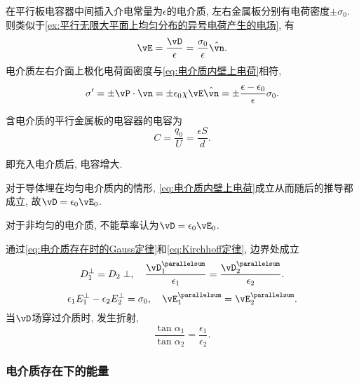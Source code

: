 \documentclass[../Electromagnetism.tex]{subfiles}
\begin{document}
\begin{ex}
	在平行板电容器中间插入介电常量为$\epsilon$的电介质, 左右金属板分别有电荷密度$\pm\sigma_{0}$. 则类似于\cref{ex:平行无限大平面上均匀分布的异号电荷产生的电场}, 有
	\[ \vE = \frac{\vD}{\epsilon} = \frac{\sigma_0}{\epsilon}\hat{\vn}. \]
	电介质左右介面上极化电荷面密度与\eqref{eq:电介质内壁上电荷}相符,
	\[ \sigma' = \pm\vP\cdot\vn = \pm \epsilon_0\chi\vE\hat{\vn} = \pm\frac{\epsilon - \epsilon_0}{\epsilon}\sigma_0. \]
\end{ex}
\begin{finale}
	\begin{corollary}[含有电介质的电容]
		含电介质的平行金属板的电容器的电容为
		\[ C = \frac{q_0}{U} = \frac{\epsilon S}{d}. \]
	\end{corollary}
\end{finale}
即充入电介质后, 电容增大.
\begin{remark}
	对于导体埋在均匀电介质内的情形, \eqref{eq:电介质内壁上电荷}成立从而随后的推导都成立, 故$\vD = \epsilon_0 \vE_0$.
\end{remark}
\begin{pitfall}
	对于非均匀的电介质, 不能草率认为$\vD = \epsilon_0 \vE_0$.
\end{pitfall}
通过\eqref{eq:电介质存在时的Gauss定律}和\eqref{eq:Kirchhoff定律}, 边界处成立
\[ D_1^\perp = D_2\perp,\quad \frac{\vD_1^{\parallelsum}}{\epsilon_1} = \frac{\vD_2^{\parallelsum}}{\epsilon_2}. \]
\[ \epsilon_1 E_1^\perp - \epsilon_2 E_2^\perp = \sigma_0,\quad \vE_1^{\parallelsum} = \vE_2^{\parallelsum}. \]
当$\vD$场穿过介质时, 发生折射,
\[ \frac{\tan \alpha_1}{\tan \alpha_2} = \frac{\epsilon_1}{\epsilon_2}. \]


\subsubsection{电介质存在下的能量} %
\label{ssub:电介质存在下的能量}
\end{document}

